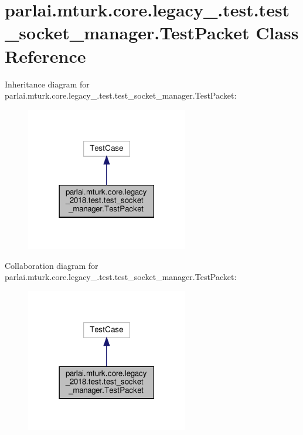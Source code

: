 \hypertarget{classparlai_1_1mturk_1_1core_1_1legacy__2018_1_1test_1_1test__socket__manager_1_1TestPacket}{}\section{parlai.\+mturk.\+core.\+legacy\+\_.\+test.\+test\+\_\+socket\+\_\+manager.\+Test\+Packet Class Reference}
\label{classparlai_1_1mturk_1_1core_1_1legacy__2018_1_1test_1_1test__socket__manager_1_1TestPacket}


Inheritance diagram for parlai.\+mturk.\+core.\+legacy\+\_.\+test.\+test\+\_\+socket\+\_\+manager.\+Test\+Packet\+:
\nopagebreak
\begin{figure}[H]
\begin{center}
\leavevmode
\includegraphics[width=201pt]{da/def/classparlai_1_1mturk_1_1core_1_1legacy__2018_1_1test_1_1test__socket__manager_1_1TestPacket__inherit__graph}
\end{center}
\end{figure}


Collaboration diagram for parlai.\+mturk.\+core.\+legacy\+\_.\+test.\+test\+\_\+socket\+\_\+manager.\+Test\+Packet\+:
\nopagebreak
\begin{figure}[H]
\begin{center}
\leavevmode
\includegraphics[width=201pt]{dd/d56/classparlai_1_1mturk_1_1core_1_1legacy__2018_1_1test_1_1test__socket__manager_1_1TestPacket__coll__graph}
\end{center}
\end{figure}
